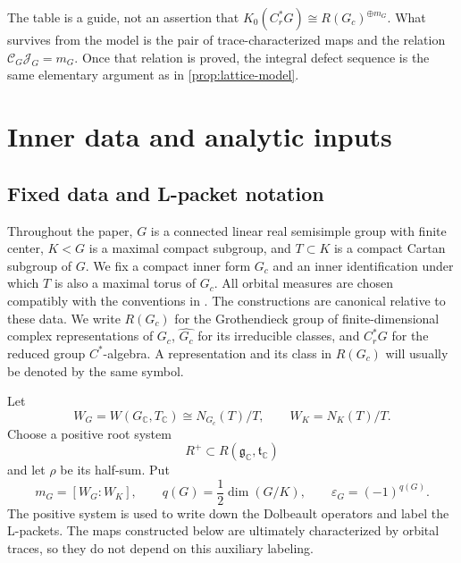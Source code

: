 \documentclass[11pt]{amsart}
\theoremstyle{definition}
\theoremstyle{remark}
\newcommand{\C}{\mathbb C}
\newcommand{\Cr}{C_r^*}
\begin{document}
The table is a guide, not an assertion that
\(K_0(C_r^*G)\cong R(G_c)^{\oplus m_G}\).  What survives from the model is the
pair of trace-characterized maps and the relation
\(\mathcal C_G\mathcal J_G=m_G\).  Once that relation is proved, the integral
defect sequence is the same elementary argument as in
\cref{prop:lattice-model}.

\section{Inner data and analytic inputs}\label{sec:inputs}

\subsection{Fixed data and L-packet notation}

Throughout the paper, $G$ is a connected linear real semisimple group with finite center, $K<G$ is a maximal compact subgroup, and $T\subset K$ is a compact Cartan subgroup of $G$.  We fix a compact inner form $G_c$ and an inner identification under which $T$ is also a maximal torus of $G_c$.  All orbital measures are chosen compatibly with the conventions in \cite[Sections~2 and~6]{HochsWang2019Orbital}.  The constructions are canonical relative to these data.  We write $R(G_c)$ for the Grothendieck group of finite-dimensional complex representations of $G_c$, $\widehat{G_c}$ for its irreducible classes, and $\Cr G$ for the reduced group $C^*$-algebra.  A representation and its class in $R(G_c)$ will usually be denoted by the same symbol.

Let
\[
  W_G=W(G_{\C},T_{\C})\cong N_{G_c}(T)/T,
  \qquad
  W_K=N_K(T)/T.
\]
Choose a positive root system
\[
  R^+\subset R(\mathfrak g_{\C},\mathfrak t_{\C})
\]
and let $\rho$ be its half-sum.  Put
\[
  m_G=[W_G:W_K],
  \qquad
  q(G)=\frac12\dim(G/K),
  \qquad
  \varepsilon_G=(-1)^{q(G)}.
\]
The positive system is used to write down the Dolbeault operators and label the L-packets.  The maps constructed below are ultimately characterized by orbital traces, so they do not depend on this auxiliary labeling.
\end{document}
